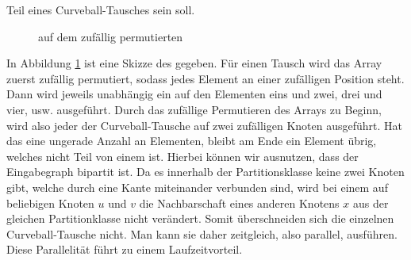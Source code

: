 Teil eines Curveball-Tausches sein soll.
%
%
% 
\begin{figure}
\centering
  \caption{\gc{} auf dem zufällig permutierten \partvek}
  \label{fig:global_curveball_trade_vector}
  
\end{figure}
%
%
%
In Abbildung \ref{fig:global_curveball_trade_vector} ist eine Skizze des  gegeben.
Für einen \gc{} Tausch wird das Array zuerst zufällig permutiert, sodass jedes Element an einer zufälligen
Position steht.
Dann wird jeweils unabhängig ein \ct{} auf den Elementen eins und zwei, drei und vier, usw. ausgeführt.
Durch das zufällige Permutieren des Arrays zu Beginn, wird also jeder der Curveball-Tausche auf zwei zufälligen
Knoten ausgeführt. Hat das \partvek{} eine ungerade Anzahl an Elementen, bleibt am Ende ein Element übrig, 
welches nicht Teil von einem \ct{} ist. 
Hierbei können wir ausnutzen, dass der Eingabegraph bipartit ist. Da es innerhalb der Partitionsklasse 
keine zwei Knoten gibt, welche durch eine Kante miteinander verbunden sind, 
wird bei einem \ct{} auf beliebigen Knoten $u$ und $v$ 
die Nachbarschaft eines anderen Knotens $x$  aus der gleichen Partitionklasse nicht verändert. Somit
\glqq überschneiden\grqq{} sich die einzelnen Curveball-Tausche nicht. Man kann sie daher zeitgleich, 
also parallel, ausführen. Diese Parallelität führt zu einem Laufzeitvorteil.
\\
